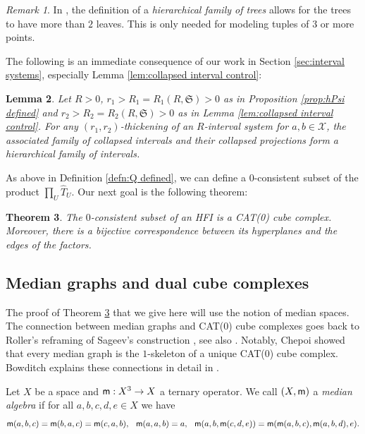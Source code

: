 \documentclass{amsart}
\newtheorem{theorem}{Theorem}[section]
\newtheorem{lemma}[theorem]{Lemma}
\theoremstyle{definition}
\theoremstyle{remark}
\newtheorem{remark}[theorem]{Remark}
\theoremstyle{definition}
\newcommand{\mm}{{\sf m}}
\newcommand{\calX}{\mathcal{X}}
\newcommand{\hT}{\widehat{T}}
\begin{document}
\begin{remark}
In \cite[Definition 12.1]{Dur_infcube}, the definition of a \emph{hierarchical family of trees} allows for the trees to have more than $2$ leaves.  This is only needed for modeling tuples of $3$ or more points.
\end{remark}

The following is an immediate consequence of our work in Section \ref{sec:interval systems}, especially Lemma \ref{lem:collapsed interval control}:

\begin{lemma}\label{lem:HHS to HFI}
Let $R>0$, $r_1 > R_1=R_1(R,\mathfrak S)>0$ as in Proposition \ref{prop:hPsi defined} and $r_2 > R_2=R_2(R,\mathfrak S)>0$ as in Lemma \ref{lem:collapsed interval control}.  For any $(r_1,r_2)$-thickening of an $R$-interval system for $a,b \in \calX$, the associated family of collapsed intervals and their collapsed projections form a hierarchical family of intervals.
\end{lemma}

As above in Definition \ref{defn:Q defined}, we can define a $0$-consistent subset of the product $\prod_U \hT_U$.  Our next goal is the following theorem:

\begin{theorem}\label{thm:Q CCC}
The $0$-consistent subset of an HFI is a CAT(0) cube complex.  Moreover, there is a bijective correspondence between its hyperplanes and the edges of the factors. 
\end{theorem}
    

\subsection{Median graphs and dual cube complexes}

The proof of Theorem \ref{thm:Q CCC} that we give here will use the notion of median spaces.  The connection between median graphs and CAT(0) cube complexes goes back to Roller's \cite{Roller} reframing of Sageev's construction \cite{Sageev:cubulation}, see also \cite{CN05, Nica}.  Notably, Chepoi \cite[Theorem 6.1]{Che00} showed that every median graph is the $1$-skeleton of a unique CAT(0) cube complex.  Bowditch explains these connections in detail in \cite[Section 11]{bowditch2022median}.

Let $X$ be a space and $\mm:X^3\to X$ a ternary operator.  We call $(X,\mm)$ a \emph{median algebra} if for all $a,b,c,d,e \in X$ we have
$$\mm(a,b,c) = \mm(b,a,c) = \mm(c,a,b), \hspace{.1in} \mm(a,a,b) = a, \hspace{.1in} \mm(a,b,\mm(c,d,e)) = \mm(\mm(a,b,c),\mm(a,b,d),e).$$
\end{document}
